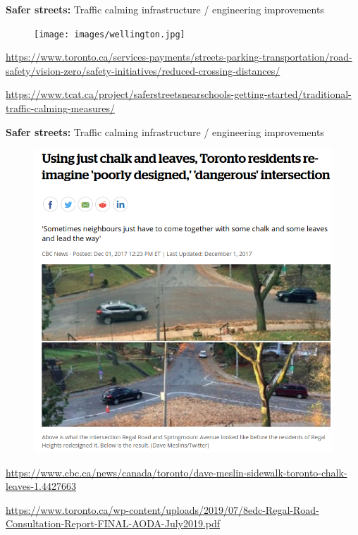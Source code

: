 \documentclass[aspectratio=169]{beamer}
\begin{document}
\begin{frame}
	
	\textbf{Safer streets:} Traffic calming infrastructure / engineering improvements
	
	\begin{figure}
		\centering
		\texttt{[image: images/wellington.jpg]}
	\end{figure}

	\tiny\url{https://www.toronto.ca/services-payments/streets-parking-transportation/road-safety/vision-zero/safety-initiatives/reduced-crossing-distances/}
	
	\tiny\url{https://www.tcat.ca/project/saferstreetsnearschools-getting-started/traditional-traffic-calming-measures/}
	
\end{frame}








\begin{frame}
	
	\textbf{Safer streets:} Traffic calming infrastructure / engineering improvements
	
		\begin{figure}
		\centering
		\includegraphics[width=0.55\linewidth]{images/leaves_road.png}
	\end{figure}
	
	\tiny\url{https://www.cbc.ca/news/canada/toronto/dave-meslin-sidewalk-toronto-chalk-leaves-1.4427663}
	
	\tiny\url{https://www.toronto.ca/wp-content/uploads/2019/07/8edc-Regal-Road-Consultation-Report-FINAL-AODA-July2019.pdf}
	
\end{frame}
\end{document}
